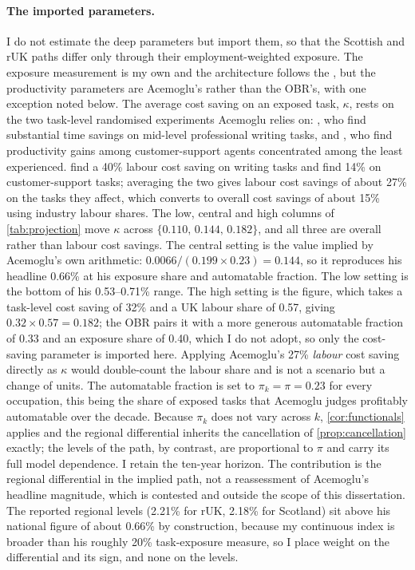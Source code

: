 \paragraph{The imported parameters.} I do not estimate the deep parameters but import them, so that the Scottish and rUK paths differ only through their employment-weighted exposure. The exposure measurement is my own and the architecture follows the \citet{obr2025}, but the productivity parameters are Acemoglu's rather than the OBR's, with one exception noted below. The average cost saving on an exposed task, $\kappa$, rests on the two task-level randomised experiments Acemoglu relies on: \citet{noy2023}, who find substantial time savings on mid-level professional writing tasks, and \citet{brynjolfsson2025}, who find productivity gains among customer-support agents concentrated among the least experienced. \citet{noy2023} find a 40\% labour cost saving on writing tasks and \citet{brynjolfsson2025} find 14\% on customer-support tasks; averaging the two gives labour cost savings of about 27\% on the tasks they affect, which \citet{acemoglu2025} converts to overall cost savings of about 15\% using industry labour shares. The low, central and high columns of \cref{tab:projection} move $\kappa$ across $\{0.110,\, 0.144,\, 0.182\}$, and all three are overall rather than labour cost savings. The central setting is the value implied by Acemoglu's own arithmetic: $0.0066 / (0.199 \times 0.23) = 0.144$, so it reproduces his headline 0.66\% at his exposure share and automatable fraction. The low setting is the bottom of his 0.53--0.71\% range. The high setting is the \citet{obr2025} figure, which takes a task-level cost saving of 32\% and a UK labour share of 0.57, giving $0.32 \times 0.57 = 0.182$; the OBR pairs it with a more generous automatable fraction of 0.33 and an exposure share of 0.40, which I do not adopt, so only the cost-saving parameter is imported here. Applying Acemoglu's 27\% \emph{labour} cost saving directly as $\kappa$ would double-count the labour share and is not a scenario but a change of units. The automatable fraction is set to $\pi_k = \pi = 0.23$ for every occupation, this being the share of exposed tasks that Acemoglu judges profitably automatable over the decade. Because $\pi_k$ does not vary across $k$, \cref{cor:functionals} applies and the regional differential inherits the cancellation of \cref{prop:cancellation} exactly; the levels of the path, by contrast, are proportional to $\pi$ and carry its full model dependence. I retain the ten-year horizon. The contribution is the regional differential in the implied path, not a reassessment of Acemoglu's headline magnitude, which is contested and outside the scope of this dissertation. The reported regional levels (2.21\% for rUK, 2.18\% for Scotland) sit above his national figure of about 0.66\% by construction, because my continuous index is broader than his roughly 20\% task-exposure measure, so I place weight on the differential and its sign, and none on the levels.

